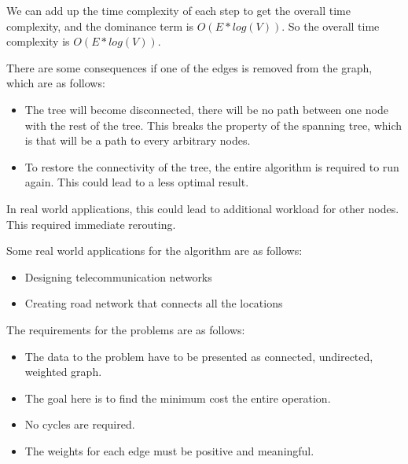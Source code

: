 \documentclass{article}
\begin{document}
  We can add up the time complexity of each step to get the overall time complexity,
  and the dominance term is $O(E * log (V))$.
  So the overall time complexity is $O(E * log (V))$.


  There are some consequences if one of the edges is removed from the graph, which are as follows:
  \begin{itemize}
    \item The tree will become disconnected, there will be no path between one node with the rest of the tree.
  This breaks the property of the spanning tree, which is that will be a path to every arbitrary nodes.
    \item To restore the connectivity of the tree, the entire algorithm is required to run again. This could lead to a less optimal result.
  \end{itemize}

  In real world applications, this could lead to additional workload for other nodes. This required immediate rerouting.
  

  Some real world applications for the algorithm are as follows:
  \begin{itemize}
    \item Designing telecommunication networks
    \item Creating road network that connects all the locations 
  \end{itemize}
  
  The requirements for the problems are as follows:
  \begin{itemize}
    \item The data to the problem have to be presented as connected, undirected, weighted graph. 
    \item The goal here is to find the minimum cost the entire operation. 
    \item No cycles are required. 
    \item The weights for each edge must be positive and meaningful.
  \end{itemize}
  
  


  
  
\end{document}
